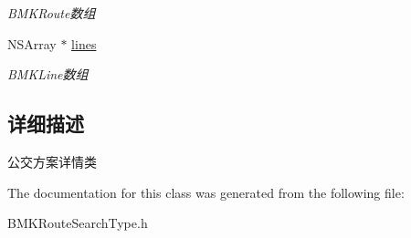 \begin{DoxyCompactItemize}
\begin{DoxyCompactList}\small\item\em B\-M\-K\-Route数组 \end{DoxyCompactList}\item 
\hypertarget{interface_b_m_k_transit_route_plan_a76eb4afd803434e6252318822c5df75e}{N\-S\-Array $\ast$ \hyperlink{interface_b_m_k_transit_route_plan_a76eb4afd803434e6252318822c5df75e}{lines}}\label{interface_b_m_k_transit_route_plan_a76eb4afd803434e6252318822c5df75e}

\begin{DoxyCompactList}\small\item\em B\-M\-K\-Line数组 \end{DoxyCompactList}\end{DoxyCompactItemize}


\subsection{详细描述}
公交方案详情类 

The documentation for this class was generated from the following file\-:\begin{DoxyCompactItemize}
\item 
B\-M\-K\-Route\-Search\-Type.\-h\end{DoxyCompactItemize}
